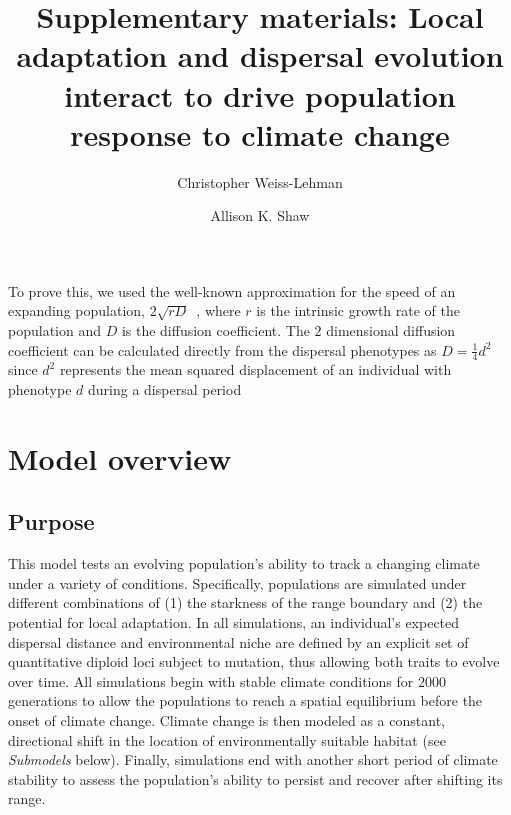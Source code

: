 \documentclass[12pt, oneside]{article}
\title{Supplementary materials: Local adaptation and dispersal evolution interact to drive population response to climate change}
\date{}
\author[1]{Christopher Weiss-Lehman}
\author[1]{Allison K. Shaw}
\affil[1]{Ecology, Evolution, and Behavior, University of Minnesota}
\begin{document}
\maketitle

\doublespacing
\linenumbers

\renewcommand{\thefigure}{S\arabic{figure}}
\renewcommand{\thetable}{S\arabic{table}}
\renewcommand{\theequation}{S\arabic{equation}}

To prove this, we used the well-known approximation for the speed of an expanding population, $2\sqrt{rD}$~\citep{hastings2005spatial}, where $r$ is the intrinsic growth rate of the population and $D$ is the diffusion coefficient. The $2$ dimensional diffusion coefficient can be calculated directly from the dispersal phenotypes as $D=\frac{1}{4}d^{2}$ since $d^{2}$ represents the mean squared displacement of an individual with phenotype $d$ during a dispersal period 


\section*{Model overview}
\subsection*{Purpose} 
This model tests an evolving population's ability to track a changing climate under a variety of conditions. Specifically, populations are simulated under different combinations of (1) the starkness of the range boundary and (2) the potential for local adaptation. In all simulations, an individual's expected dispersal distance and environmental niche are defined by an explicit set of quantitative diploid loci subject to mutation, thus allowing both traits to evolve over time. All simulations begin with stable climate conditions for $2000$ generations to allow the populations to reach a spatial equilibrium before the onset of climate change. Climate change is then modeled as a constant, directional shift in the location of environmentally suitable habitat (see \textit{Submodels} below). Finally, simulations end with another short period of climate stability to assess the population's ability to persist and recover after shifting its range.
\end{document}
